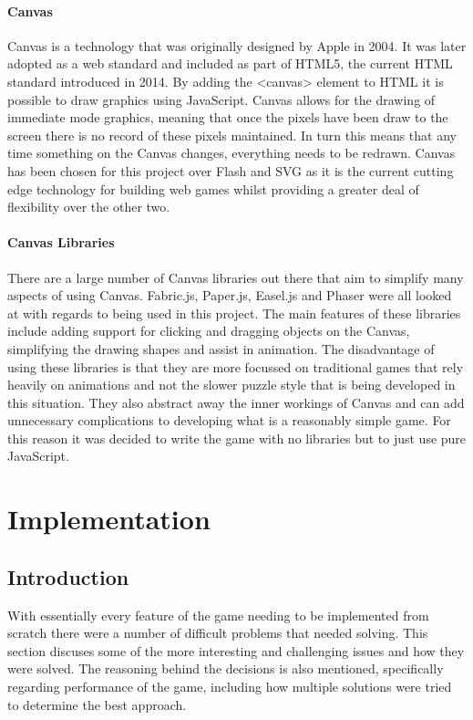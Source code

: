 \documentclass[12pt,a4paper]{report}
\begin{document}
\subsubsection{Canvas}
Canvas is a technology that was originally designed by Apple in 2004. It was later adopted as a web standard and included as part of HTML5, the current HTML standard introduced in 2014. By adding the <canvas> element to HTML it is possible to draw graphics using JavaScript. Canvas allows for the drawing of immediate mode graphics, meaning that once the pixels have been draw to the screen there is no record of these pixels maintained. In turn this means that any time something on the Canvas changes, everything needs to be redrawn. Canvas has been chosen for this project over Flash and SVG as it is the current cutting edge technology for building web games whilst providing a greater deal of flexibility over the other two.

\subsubsection{Canvas Libraries}
There are a large number of Canvas libraries out there that aim to simplify many aspects of using Canvas. Fabric.js, Paper.js, Easel.js and Phaser were all looked at with regards to being used in this project. The main features of these libraries include adding support for clicking and dragging objects on the Canvas, simplifying the drawing shapes and assist in animation.
The disadvantage of using these libraries is that they are more focussed on traditional games that rely heavily on animations and not the slower puzzle style that is being developed in this situation. They also abstract away the inner workings of Canvas and can add unnecessary complications to developing what is a reasonably simple game. For this reason it was decided to write the game with no libraries but to just use pure JavaScript.


\chapter{Implementation}

\section{Introduction}
With essentially every feature of the game needing to be implemented from scratch there were a number of difficult problems that needed solving. This section discuses some of the more interesting and challenging issues and how they were solved. The reasoning behind the decisions is also mentioned, specifically regarding performance of the game, including how multiple solutions were tried to determine the best approach. 
\end{document}
